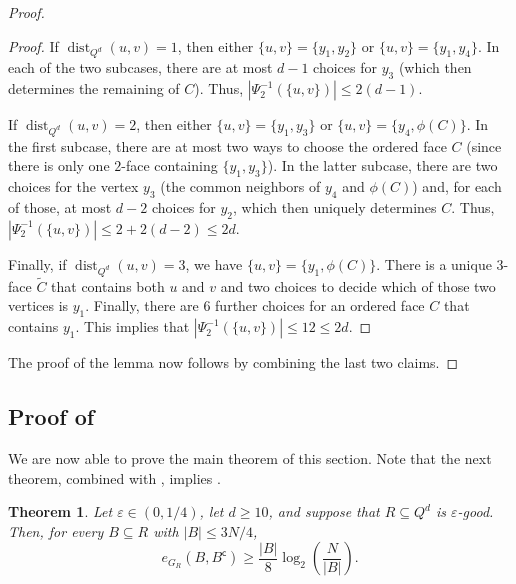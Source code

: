 \documentclass[11pt,a4paper,oneside,reqno]{amsart}
\newtheorem{theorem}{Theorem}[section]
\DeclareMathOperator{\dist}{dist}
\newcommand{\eps}{\varepsilon}
\begin{document}
\begin{proof}
\begin{proof}
    If $\dist_{Q^d}(u,v)=1$, then either $\{u,v\} = \{y_1,y_2\}$ or $\{u,v\}=\{y_1,y_4\}$. In each of the two subcases, there are at most $d-1$ choices for $y_3$ (which then determines the remaining of $C$).  Thus, $|\Psi_2^{-1}(\{u,v\})| \le 2(d-1)$.

    If $\dist_{Q^d}(u,v)=2$, then either $\{u,v\}=\{y_1,y_3\}$ or $\{u,v\}=\{y_4,\phi(C)\}$.  In the first subcase, there are at most two ways to choose the ordered face $C$ (since there is only one $2$-face containing $\{y_1,y_3\}$). In the latter subcase, there are two choices for the vertex $y_3$ (the common neighbors of $y_4$ and $\phi(C)$) and, for each of those, at most $d-2$ choices for $y_2$, which then uniquely determines $C$.  Thus, $|\Psi_2^{-1}(\{u,v\})| \leq 2 + 2(d-2) \le 2d$.

    Finally, if $\dist_{Q^d}(u,v)=3$, we have $\{u,v\}=\{y_1,\phi(C)\}$.  There is a unique $3$-face $\tilde{C}$ that contains both $u$ and $v$ and two choices to decide which of those two vertices is $y_1$.  Finally, there are $6$ further choices for an ordered face $C$ that contains $y_1$. This implies that $|\Psi_2^{-1}(\{u,v\})|\leq 12 \le 2d$.
  \end{proof}

  The proof of the lemma now follows by combining the last two claims.
\end{proof}

\subsection{Proof of }

We are now able to prove the main theorem of this section. Note that the next theorem, combined with , implies .

\begin{theorem}\label{thm:R}
  Let $\eps \in (0, 1/4)$, let $d \ge 10$, and suppose that $R \subseteq Q^d$ is $\eps$-good. Then, for every $B\subseteq R$ with $|B| \le 3N/4$,
  \[
    e_{G_R}(B,B^{\mathsf{c}})\geq \frac{|B|}{8} \log_2\left(\frac{N}{|B|}\right).
  \]
\end{theorem}
\end{document}
